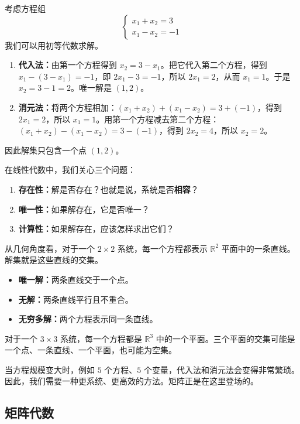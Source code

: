 \begin{example}[一个 $2\times 2$ 系统]
考虑方程组
\[
\begin{cases}
x_1 + x_2 = 3 \\
x_1 - x_2 = -1
\end{cases}
\]
我们可以用初等代数求解。
\begin{enumerate}
    \item \textbf{代入法：}由第一个方程得到 $x_2 = 3-x_1$。把它代入第二个方程，得到 $x_1-(3-x_1)=-1$，即 $2x_1-3=-1$，所以 $2x_1=2$，从而 $x_1=1$。于是 $x_2=3-1=2$。唯一解是 $(1,2)$。
    \item \textbf{消元法：}将两个方程相加：$(x_1+x_2)+(x_1-x_2)=3+(-1)$，得到 $2x_1=2$，所以 $x_1=1$。用第一个方程减去第二个方程：$(x_1+x_2)-(x_1-x_2)=3-(-1)$，得到 $2x_2=4$，所以 $x_2=2$。
\end{enumerate}
因此解集只包含一个点 $(1,2)$。
\end{example}

在线性代数中，我们关心三个问题：
\begin{enumerate}
    \item \textbf{存在性：}解是否存在？也就是说，系统是否\textbf{相容}？
    \item \textbf{唯一性：}如果解存在，它是否唯一？
    \item \textbf{计算性：}如果解存在，应该怎样求出它们？
\end{enumerate}

从几何角度看，对于一个 $2\times 2$ 系统，每一个方程都表示 $\mathbb{R}^2$ 平面中的一条直线。解集就是这些直线的交集。
\begin{itemize}
    \item \textbf{唯一解：}两条直线交于一个点。
    \item \textbf{无解：}两条直线平行且不重合。
    \item \textbf{无穷多解：}两个方程表示同一条直线。
\end{itemize}

对于一个 $3\times 3$ 系统，每一个方程都是 $\mathbb{R}^3$ 中的一个平面。三个平面的交集可能是一个点、一条直线、一个平面，也可能为空集。

当方程规模变大时，例如 $5$ 个方程、$5$ 个变量，代入法和消元法会变得非常繁琐。因此，我们需要一种更系统、更高效的方法。矩阵正是在这里登场的。

\subsection{矩阵代数}

